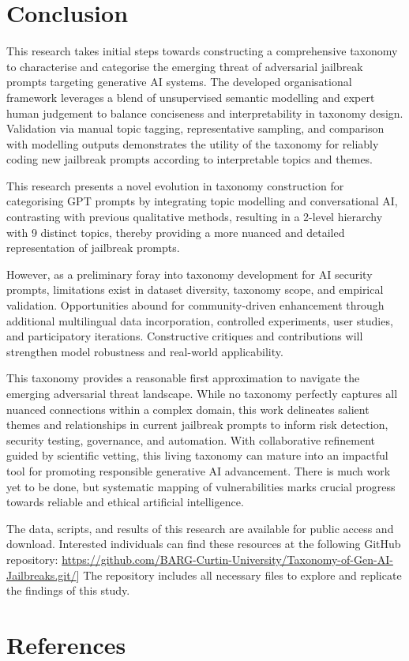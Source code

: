 \documentclass[
  letterpaper,
  DIV=11,
  numbers=noendperiod]{scrartcl}
\begin{document}
\section{Conclusion}\label{conclusion}

This research takes initial steps towards constructing a comprehensive
taxonomy to characterise and categorise the emerging threat of
adversarial jailbreak prompts targeting generative AI systems. The
developed organisational framework leverages a blend of unsupervised
semantic modelling and expert human judgement to balance conciseness and
interpretability in taxonomy design. Validation via manual topic
tagging, representative sampling, and comparison with modelling outputs
demonstrates the utility of the taxonomy for reliably coding new
jailbreak prompts according to interpretable topics and themes.

This research presents a novel evolution in taxonomy construction for
categorising GPT prompts by integrating topic modelling and
conversational AI, contrasting with previous qualitative methods,
resulting in a 2-level hierarchy with 9 distinct topics, thereby
providing a more nuanced and detailed representation of jailbreak
prompts.

However, as a preliminary foray into taxonomy development for AI
security prompts, limitations exist in dataset diversity, taxonomy
scope, and empirical validation. Opportunities abound for
community-driven enhancement through additional multilingual data
incorporation, controlled experiments, user studies, and participatory
iterations. Constructive critiques and contributions will strengthen
model robustness and real-world applicability.

This taxonomy provides a reasonable first approximation to navigate the
emerging adversarial threat landscape. While no taxonomy perfectly
captures all nuanced connections within a complex domain, this work
delineates salient themes and relationships in current jailbreak prompts
to inform risk detection, security testing, governance, and automation.
With collaborative refinement guided by scientific vetting, this living
taxonomy can mature into an impactful tool for promoting responsible
generative AI advancement. There is much work yet to be done, but
systematic mapping of vulnerabilities marks crucial progress towards
reliable and ethical artificial intelligence.

The data, scripts, and results of this research are available for public
access and download. Interested individuals can find these resources at
the following GitHub repository:
\url{https://github.com/BARG-Curtin-University/Taxonomy-of-Gen-AI-Jailbreaks.git/}{]}
The repository includes all necessary files to explore and replicate the
findings of this study.

\section{References}\label{references}
\end{document}
